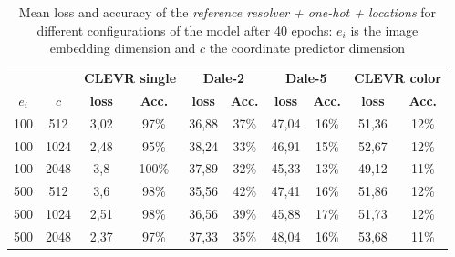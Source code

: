 \begin{table}[ht]
    \centering
    \begin{tabular}{cc|cc|cc|cc|cc}
        \toprule
              &        & \multicolumn{2}{c}{\textbf{CLEVR single}} & \multicolumn{2}{c}{\textbf{Dale-2}} & \multicolumn{2}{c}{\textbf{Dale-5}} & \multicolumn{2}{c}{\textbf{CLEVR color}}                                                                 \\  \cmidrule(lr){3-4}\cmidrule(lr){5-6}\cmidrule(lr){7-8}\cmidrule(lr){9-10}
        $e_i$ & $c$    & \textbf{loss}                             & \textbf{Acc.}                       & \textbf{loss}                       & \textbf{Acc.}                            & \textbf{loss} & \textbf{Acc.} & \textbf{loss} & \textbf{Acc.} \\\midrule
        {100} & {512}  & {3,02}                                    & {97\%}                              & {36,88}                             & {37\%}                                   & {47,04}       & {16\%}        & {51,36}       & {12\%}        \\
        {100} & {1024} & {2,48}                                    & {95\%}                              & {38,24}                             & {33\%}                                   & {46,91}       & {15\%}        & {52,67}       & {12\%}        \\
        {100} & {2048} & {3,8}                                     & {100\%}                             & {37,89}                             & {32\%}                                   & {45,33}       & {13\%}        & {49,12}       & {11\%}        \\
        {500} & {512}  & {3,6}                                     & {98\%}                              & {35,56}                             & {42\%}                                   & {47,41}       & {16\%}        & {51,86}       & {12\%}        \\
        {500} & {1024} & {2,51}                                    & {98\%}                              & {36,56}                             & {39\%}                                   & {45,88}       & {17\%}        & {51,73}       & {12\%}        \\
        {500} & {2048} & {2,37}                                    & {97\%}                              & {37,33}                             & {35\%}                                   & {48,04}       & {16\%}        & {53,68}       & {11\%}        \\
        \bottomrule
    \end{tabular}
    \caption{Mean loss and accuracy of the \emph{reference resolver + one-hot + locations} for different configurations of the model after 40 epochs: $e_i$ is the image embedding dimension and $c$ the coordinate predictor dimension}
    \label{tab:results:reference-resolver-one-hot-location}
\end{table}

